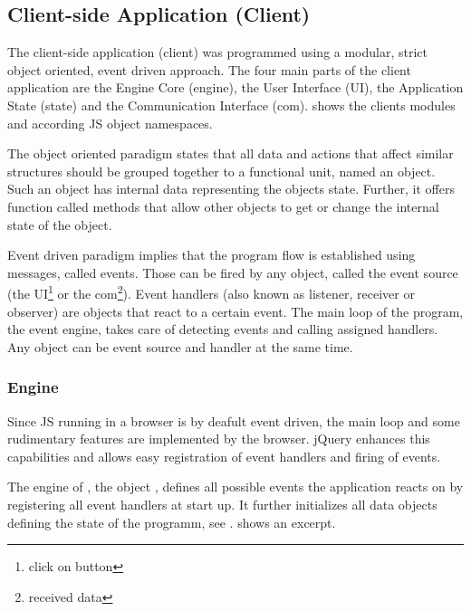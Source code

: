 \subsection{Client-side Application (Client)}
\label{sec:client}

The client-side application (client) was programmed using a modular, strict object oriented, event driven approach.
The four main parts of the client application are the Engine Core (engine), the User Interface (UI), the Application State (state) and the Communication Interface (com).
 shows the clients modules and according JS object namespaces.


The object oriented paradigm states that all data and actions that affect similar structures should be grouped together to a functional unit, named an object.
Such an object has internal data representing the objects state.
Further, it offers function called methods that allow other objects to get or change the internal state of the object.

Event driven paradigm implies that the program flow is established using messages, called events.
Those can be fired by any object, called the event source (the UI\footnote{click on button} or the com\footnote{received data}).
Event handlers (also known as listener, receiver or observer) are objects that react to a certain event.
The main loop of the program, the event engine, takes care of detecting events and calling assigned handlers.
Any object can be event source and handler at the same time.


\subsubsection{Engine}
\label{sec:engine}

Since JS running in a browser is by deafult event driven, the main loop and some rudimentary features are implemented by the browser.
jQuery enhances this capabilities and allows easy registration of event handlers and firing of events.

The engine of \spl, the object , defines all possible events the application reacts on by registering all event handlers at start up.
It further initializes all data objects defining the state of the programm, see .
 shows an excerpt.



